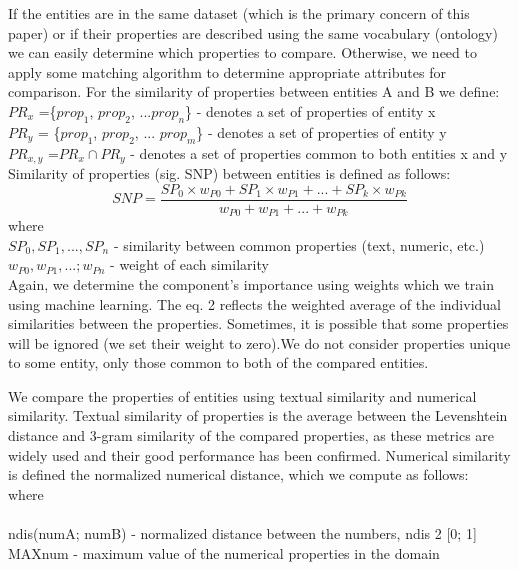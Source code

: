 \documentclass{llncs}
\begin{document}
If the entities are in the same dataset (which is the primary concern of this paper)
or if their properties are described using the same vocabulary (ontology) we can
easily determine which properties to compare. Otherwise, we need to apply some
matching algorithm to determine appropriate attributes for comparison. For the
similarity of properties between entities A and B we define:\\
\newline
$PR_x$ =\{$prop_1$, $ prop_2$, ...$ prop_n$\} - denotes a set of properties of entity x\\
$PR_y$ = \{$prop_1$, $prop_2$, ... $prop_m$\} - denotes a set of properties of entity y\\
$PR_{x,y}$ =$ PR_x \cap PR_y$  - denotes a set of properties common to both entities x and y\\

Similarity of properties (sig. SNP) between entities is defined as follows:\\


\begin {equation}
SNP=\frac{SP_0 \times w_{P0} +SP_1 \times w_{P1} + ... +SP_k \times w_{Pk}}{w_{P0} + w_{P1} + ... + w_{Pk}}
\label{rov1}
\end {equation}
\newline
where\\
$SP_0, SP_1,...,  SP_n$ - similarity between common properties (text, numeric, etc.)\\
$w_{P0} , w_{P1} ,...; w_{Pn}$ - weight of each similarity\\
\newline
Again, we determine the component's importance using weights which we train
using machine learning. The eq. 2 reflects the weighted average of the individual
similarities between the properties. Sometimes, it is possible that some properties
will be ignored (we set their weight to zero).We do not consider properties unique
to some entity, only those common to both of the compared entities.

We compare the properties of entities using textual similarity and numerical
similarity. Textual similarity of properties is the average between the Levenshtein
distance and 3-gram similarity of the compared properties, as these metrics
are widely used and their good performance has been confirmed. Numerical
similarity is defined the normalized numerical distance, which we compute as
follows:\\
where\\
\vspace{5mm} \\
ndis(numA; numB) - normalized distance between the numbers, ndis 2 [0; 1]
MAXnum - maximum value of the numerical properties in the domain
\vspace{5mm} \\
\end{document}
